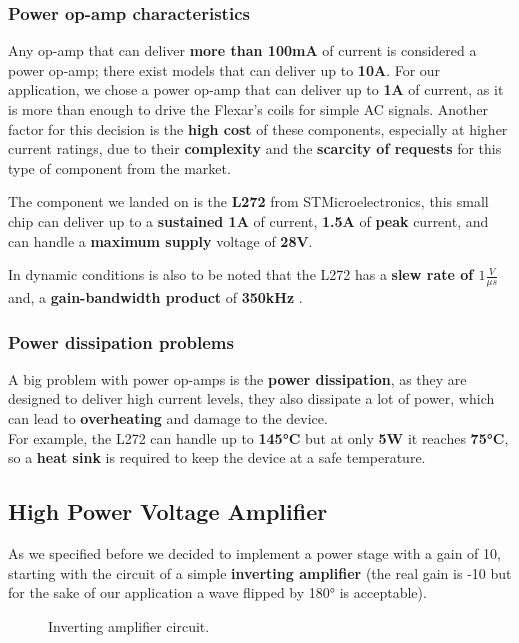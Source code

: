 \subsubsection{Power op-amp characteristics}
Any op-amp that can deliver \textbf{more than 100mA} of current is considered a power op-amp; there exist models that can deliver up to \textbf{10A}.
For our application, we chose a power op-amp that can deliver up to \textbf{1A} of current, as it is more than enough to drive the Flexar's coils for simple AC signals.
Another factor for this decision is the \textbf{high cost} of these components, especially at higher current ratings, due to their \textbf{complexity} and the \textbf{scarcity of requests} for this type of component from the market.

The component we landed on is the \textbf{L272} from STMicroelectronics, this small chip can deliver up to a \textbf{sustained 1A} of current, \textbf{1.5A} of \textbf{peak} current, and can handle a \textbf{maximum supply} voltage of \textbf{28V}.

In dynamic conditions is also to be noted that the L272 has a \textbf{slew rate of $1\frac{V}{\mu s}$} and, a \textbf{gain-bandwidth product} of \textbf{350kHz} \cite{L272}.

\subsubsection{Power dissipation problems}
A big problem with power op-amps is the \textbf{power dissipation}, as they are designed to deliver high current levels, they also dissipate a lot of power, which can lead to \textbf{overheating} and damage to the device. \\
For example, the L272 can handle up to \textbf{145°C} but at only \textbf{5W} it reaches \textbf{75°C}, so a \textbf{heat sink} is required to keep the device at a safe temperature.

\subsection{High Power Voltage Amplifier}
As we specified before we decided to implement a power stage with a gain of 10, starting with the circuit of a simple \textbf{inverting amplifier} (the real gain is -10 but for the sake of our application a wave flipped by 180° is acceptable).

\begin{figure}[H]
    \centering
    \resizebox{.6\linewidth}{!}{}
    \caption{Inverting amplifier circuit.}
    \label{fig:non-inv_ampl}
\end{figure}

